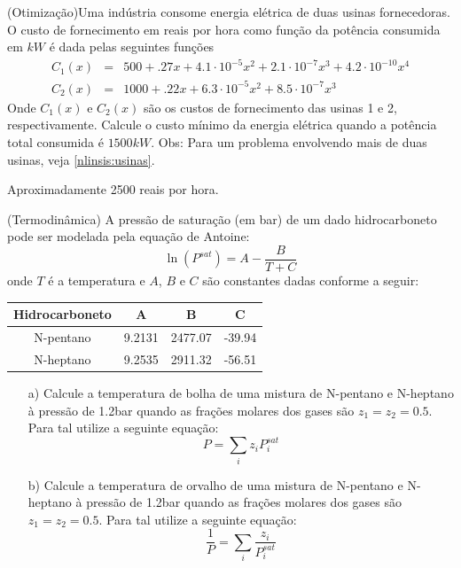 \begin{exer}(Otimização)\label{1d:usinas}Uma indústria consome energia elétrica de duas usinas fornecedoras. O custo de fornecimento em reais por hora como função da potência consumida em $kW$ é dada pelas seguintes funções
\begin{eqnarray}
C_1(x)&=& 500+.27 x + 4.1\cdot 10^{-5}x^2 +2.1\cdot 10^{-7}x^3+4.2\cdot 10^{-10}x^4 \\
C_2(x)&=& 1000+.22 x + 6.3\cdot 10^{-5}x^2 +8.5\cdot 10^{-7}x^3
\end{eqnarray}
Onde $C_1(x)$ e $C_2(x)$ são os custos de fornecimento das usinas 1 e 2, respectivamente. Calcule o custo mínimo da energia elétrica quando a potência total consumida é  $1500kW$. Obs: Para um problema envolvendo mais de duas usinas, veja \ref{nlinsis:usinas}.
\end{exer}
\begin{resp}

 Aproximadamente 2500 reais por hora.

\end{resp}

\begin{exer}(Termodinâmica) A pressão de saturação (em bar) de um dado hidrocarboneto pode ser modelada pela equação de Antoine:
\begin{equation} \ln\left(P^{sat}\right)=A-\frac{B}{T+C} \end{equation}
onde $T$ é a temperatura e $A$, $B$ e $C$ são constantes dadas conforme a seguir:

\begin{tabular}{|c|c|c|c|}
\hline
Hidrocarboneto&A&B&C\\
\hline
N-pentano & 9.2131 & 2477.07 & -39.94 \\
\hline
N-heptano & 9.2535 &2911.32 &-56.51 \\
\hline
\end{tabular}
\begin{itemize}
\item[a)] Calcule a temperatura de bolha de uma mistura de N-pentano e N-heptano à pressão de 1.2bar quando as frações molares  dos gases são  $z_1=z_2=0.5$. Para tal utilize a seguinte equação:
\begin{equation} P=\sum_i z_i P_i^{sat} \end{equation}
\item[b)] Calcule a temperatura de orvalho de uma mistura de N-pentano e N-heptano à pressão de 1.2bar quando as frações molares  dos gases são  $z_1=z_2=0.5$. Para tal utilize a seguinte equação:
\begin{equation} \frac{1}{P}=\sum_i \frac{z_i}{P_i^{sat}} \end{equation}
\end{itemize}
\end{exer}

